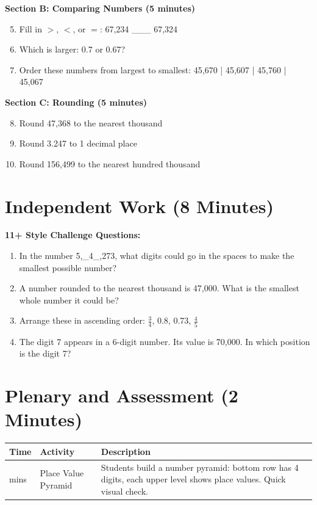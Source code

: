 \documentclass{article}
\begin{document}
\textbf{Section B: Comparing Numbers (5 minutes)}
\begin{enumerate}
    \setcounter{enumi}{4}
    \item Fill in $>$, $<$, or $=$: 67,234 \_\_\_ 67,324
    \item Which is larger: 0.7 or 0.67?
    \item Order these numbers from largest to smallest: 45,670 | 45,607 | 45,760 | 45,067
\end{enumerate}

\textbf{Section C: Rounding (5 minutes)}
\begin{enumerate}
    \setcounter{enumi}{7}
    \item Round 47,368 to the nearest thousand
    \item Round 3.247 to 1 decimal place
    \item Round 156,499 to the nearest hundred thousand
\end{enumerate}

\section{Independent Work (8 Minutes)}

\textbf{11+ Style Challenge Questions:}
\begin{enumerate}
    \item In the number 5,\_4\_,273, what digits could go in the spaces to make the smallest possible number?
    \item A number rounded to the nearest thousand is 47,000. What is the smallest whole number it could be?
    \item Arrange these in ascending order: $\frac{3}{4}$, 0.8, 0.73, $\frac{4}{5}$
    \item The digit 7 appears in a 6-digit number. Its value is 70,000. In which position is the digit 7?
\end{enumerate}

\section{Plenary and Assessment (2 Minutes)}

\begin{tabularx}{\textwidth}{|>{\raggedright\arraybackslash}p{1cm}|>{\raggedright\arraybackslash}p{3cm}|>{\raggedright\arraybackslash}X|}
\hline
\textbf{Time} & \textbf{Activity} & \textbf{Description} \\
\hline
2 mins & Place Value Pyramid & Students build a number pyramid: bottom row has 4 digits, each upper level shows place values. Quick visual check. \\
\hline
\end{tabularx}
\end{document}
